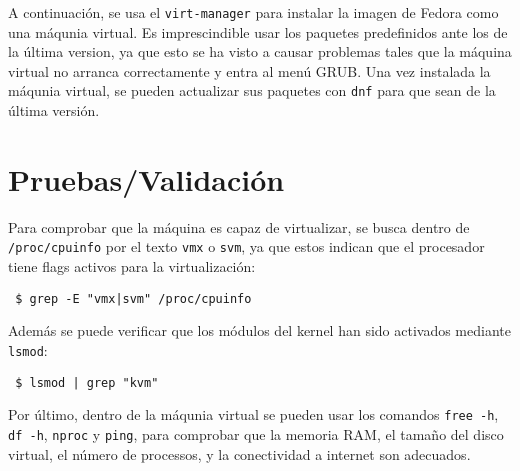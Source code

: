 \documentclass{article}
\begin{document}
A continuación, se usa el \texttt{virt-manager}
para instalar la imagen de Fedora como una máqunia virtual.
Es imprescindible usar los paquetes predefinidos ante los de la
última version, ya que esto se ha visto a causar problemas tales que la máquina
virtual no arranca correctamente y entra al menú GRUB.
Una vez instalada la máqunia virtual, se pueden actualizar
sus paquetes con \texttt{dnf} para que sean de la última versión.


\section{Pruebas/Validación}

Para comprobar que la máquina es capaz de virtualizar,
se busca dentro de \texttt{/proc/cpuinfo} por el texto \texttt{vmx} o \texttt{svm},
ya que estos indican que el procesador tiene flags activos para la virtualización:

\vspace{0.2cm}

\texttt{
\$ grep -E "vmx|svm" /proc/cpuinfo
}

\vspace{0.2cm}

Además se puede verificar que los módulos del kernel
han sido activados mediante \texttt{lsmod}:

\vspace{0.2cm}

\texttt{
\$ lsmod | grep "kvm"
}

\vspace{0.2cm}

Por último, dentro de la máqunia virtual se pueden usar los
comandos \texttt{free -h}, 
\texttt{df -h}, \texttt{nproc} y \texttt{ping}, 
para comprobar que la memoria RAM, el tamaño del disco virtual,
el número de processos, y la conectividad a internet son adecuados.
\end{document}
